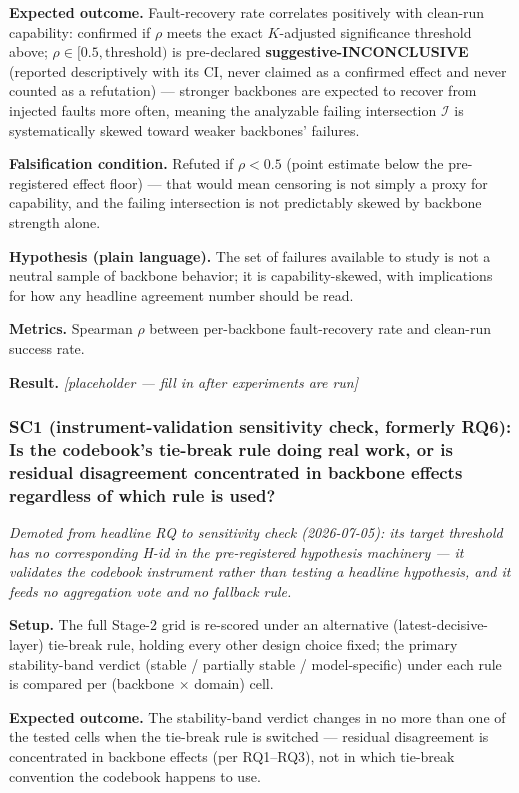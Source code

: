 \documentclass[11pt]{article}
\newcommand{\ph}{\textit{[placeholder --- fill in after experiments are run]}}
\begin{document}
\textbf{Expected outcome.} Fault-recovery rate correlates positively with clean-run capability: confirmed if $\rho$ meets the exact $K$-adjusted significance threshold above; $\rho \in [0.5, \text{threshold})$ is pre-declared \textbf{suggestive-INCONCLUSIVE} (reported descriptively with its CI, never claimed as a confirmed effect and never counted as a refutation) --- stronger backbones are expected to recover from injected faults more often, meaning the analyzable failing intersection $\mathcal{I}$ is systematically skewed toward weaker backbones' failures.

\textbf{Falsification condition.} Refuted if $\rho < 0.5$ (point estimate below the pre-registered effect floor) --- that would mean censoring is not simply a proxy for capability, and the failing intersection is not predictably skewed by backbone strength alone.

\textbf{Hypothesis (plain language).} The set of failures available to study is not a neutral sample of backbone behavior; it is capability-skewed, with implications for how any headline agreement number should be read.

\textbf{Metrics.} Spearman $\rho$ between per-backbone fault-recovery rate and clean-run success rate.

\textbf{Result.} \ph

\subsubsection{SC1 (instrument-validation sensitivity check, formerly RQ6): Is the codebook's tie-break rule doing real work, or is residual disagreement concentrated in backbone effects regardless of which rule is used?}
\emph{Demoted from headline RQ to sensitivity check (2026-07-05): its target threshold has no corresponding H-id in the pre-registered hypothesis machinery --- it validates the codebook instrument rather than testing a headline hypothesis, and it feeds no aggregation vote and no fallback rule.}

\textbf{Setup.} The full Stage-2 grid is re-scored under an alternative (latest-decisive-layer) tie-break rule, holding every other design choice fixed; the primary stability-band verdict (stable / partially stable / model-specific) under each rule is compared per (backbone $\times$ domain) cell.

\textbf{Expected outcome.} The stability-band verdict changes in no more than one of the tested cells when the tie-break rule is switched --- residual disagreement is concentrated in backbone effects (per RQ1--RQ3), not in which tie-break convention the codebook happens to use.
\end{document}
